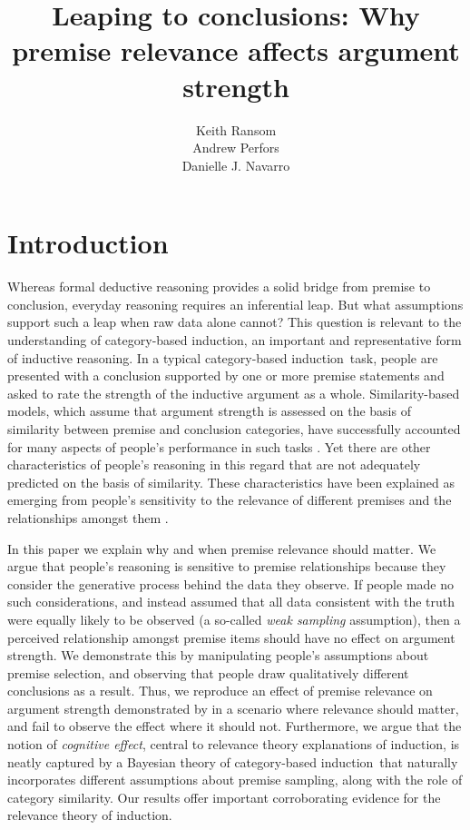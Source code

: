 \documentclass[doc,12pt]{apa}
\title{Leaping to conclusions: Why premise relevance affects argument strength}
\author{\normalsize Keith Ransom \\ Andrew Perfors \\ Danielle J. Navarro}
\affiliation{School of Psychology \\ University of Adelaide}
\newcommand{\cbi}{category-based induction}
\begin{document}
\maketitle
\noindent


\section{Introduction}
\label{intro}

Whereas formal deductive reasoning provides a solid bridge from premise to conclusion, everyday reasoning requires an inferential leap.
%
But what assumptions support such a leap when raw data alone cannot?  This question is relevant to the understanding of \cbi, an important and representative form of inductive reasoning. In a typical \cbi\ task, people are presented with a conclusion supported by one or more premise statements and asked to rate the strength of the inductive argument as a whole. Similarity-based models, which assume that argument strength is assessed on the basis of similarity between premise and conclusion categories, have successfully accounted for many aspects of people's performance in such tasks \cite{Osh90,Slo93}. Yet there are other characteristics of people's reasoning in this regard that are not adequately predicted on the basis of similarity. These characteristics have been explained as emerging from people's sensitivity to the relevance of different
premises and the relationships amongst them \cite{MCSH03}.
%

In this paper we explain why and when premise relevance should matter.
We argue that people's reasoning is sensitive to premise relationships because they consider the generative process behind the data they observe. If people made no such considerations, and instead assumed that all data consistent with the truth were equally likely to be observed (a so-called {\em weak sampling} assumption), then a perceived relationship amongst premise items should have no effect on argument strength. We demonstrate this by manipulating people's assumptions about premise selection, and observing that people draw qualitatively different conclusions as a result.  Thus, we reproduce an effect of premise relevance on argument strength demonstrated by  in a scenario where relevance should matter, and fail to observe the effect where it should not. Furthermore, we argue that the notion of {\em cognitive effect}, central to relevance theory explanations of induction, is neatly captured by a Bayesian theory of \cbi\ that naturally incorporates different assumptions about premise sampling, along with the role of category similarity. Our results offer important corroborating evidence for the relevance theory of induction.
%
\end{document}
